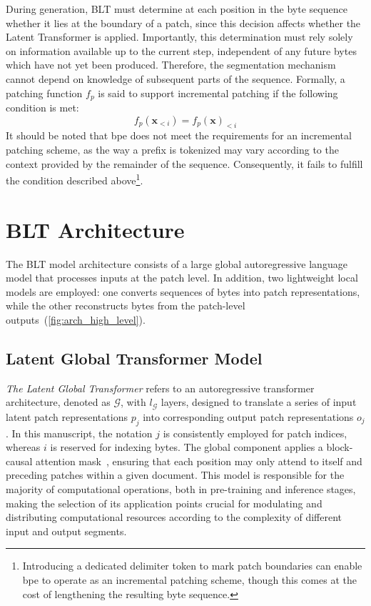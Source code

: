 During generation, {\textsc BLT} must determine at each position in the byte sequence whether it lies at the boundary of a patch, since this decision affects whether the Latent Transformer is applied. Importantly, this determination must rely solely on information available up to the current step, independent of any future bytes which have not yet been produced. Therefore, the segmentation mechanism cannot depend on knowledge of subsequent parts of the sequence. Formally, a patching function $f_p$ is said to support incremental patching if the following condition is met:
$$f_p(\pmb{x}_{<i}) = f_p(\pmb{x})_{<i}$$
It should be noted that bpe does not meet the requirements for an incremental patching scheme, as the way a prefix is tokenized may vary according to the context provided by the remainder of the sequence. Consequently, it fails to fulfill the condition described above\footnote{Introducing a dedicated delimiter token to mark patch boundaries can enable bpe to operate as an incremental patching scheme, though this comes at the cost of lengthening the resulting byte sequence.}.

\section{{\textsc BLT} Architecture}
\label{section:architecture}
The {\textsc BLT} model architecture consists of a large global autoregressive language model that processes inputs at the patch level. In addition, two lightweight local models are employed: one converts sequences of bytes into patch representations, while the other reconstructs bytes from the patch-level outputs~(\autoref{fig:arch_high_level}).

\subsection{Latent Global Transformer Model}

\textit{The Latent Global Transformer} refers to an autoregressive transformer architecture, denoted as $\mathcal{G}$, with $l_{\mathcal{G}}$ layers, designed to translate a series of input latent patch representations $p_j$ into corresponding output patch representations $o_j$. In this manuscript, the notation $j$ is consistently employed for patch indices, whereas $i$ is reserved for indexing bytes. The global component applies a block-causal attention mask~\citep{dubey2024llama}, ensuring that each position may only attend to itself and preceding patches within a given document. This model is responsible for the majority of computational operations, both in pre-training and inference stages, making the selection of its application points crucial for modulating and distributing computational resources according to the complexity of different input and output segments.

